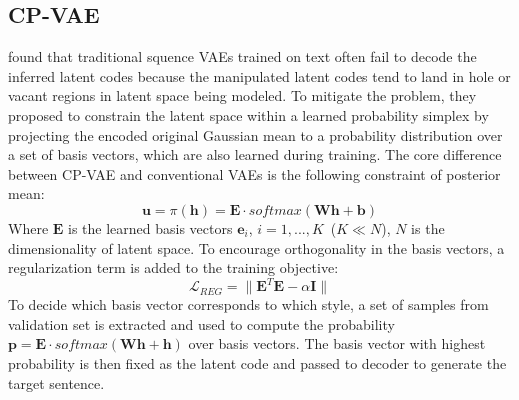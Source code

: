 \documentclass[11pt,a4paper]{article}
\begin{document}
\subsection{CP-VAE}
\citet{Xu2019} found that traditional squence VAEs trained on text often fail to decode the inferred latent codes because the manipulated latent codes tend to land in hole or vacant regions in latent space being modeled. To mitigate the problem, they proposed to constrain the latent space within a learned probability simplex by projecting the encoded original Gaussian mean to a probability distribution over a set of basis vectors, which are also learned during training.
The core difference between CP-VAE and conventional VAEs is the following constraint of posterior mean:
\begin{equation}
	 \bm{u}= \pi(\bm{h}) = \bm{E} \cdot softmax(\bm{Wh}+\bm{b})
\end{equation}
Where $\bm{E}$ is the learned basis vectors $\bm{e}_i$, $i=1,...,K$~($K\ll N$), $N$ is the dimensionality of latent space. To encourage orthogonality in the basis vectors, a regularization term is added to the training objective:
\begin{equation}
	\mathcal{L}_{REG}=\|\bm{E}^T\bm{E}-\alpha \bm{I}\|
\end{equation}
To decide which basis vector corresponds to which style, a set of samples from validation set is extracted and used to compute the probability $\bm{p}=\bm{E}\cdot softmax(\bm{Wh}+\bm{h})$ over basis vectors. The basis vector with highest probability is then fixed as the latent code and passed to decoder to generate the target sentence.


\end{document}
